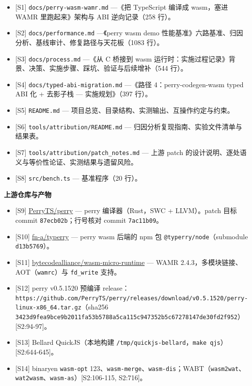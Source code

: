 \documentclass[11pt, a4paper]{article}
\begin{document}
\begin{itemize}
\item {[S1]} \texttt{docs/perry-wasm-wamr.md} —《把 TypeScript 编译成 wasm，塞进 WAMR 里跑起来》架构与 ABI 逆向记录（258 行）。
\item {[S2]} \texttt{docs/performance.md} —《perry wasm demo 性能基准》六路基准、归因分析、基线审计、修复路径与天花板（1083 行）。
\item {[S3]} \texttt{docs/process.md} —《从 C 桥接到 wasm 运行时：实施过程记录》背景、决策、实施步骤、踩坑、验证与后续增补（544 行）。
\item {[S4]} \texttt{docs/typed-abi-migration.md} —《路径 4：perry-codegen-wasm typed ABI 化 + 去影子栈 — 实施规划》（397 行）。
\item {[S5]} \texttt{README.md} — 项目总览、目录结构、实测输出、互操作约定与约束。
\item {[S6]} \texttt{tools/attribution/README.md} — 归因分析复现指南、实验文件清单与结果表。
\item {[S7]} \texttt{tools/attribution/patch\_notes.md} — 上游 patch 的设计说明、逐处语义与等价性论证、实测结果与遗留风险。
\item {[S8]} \texttt{src/bench.ts} — 基准程序（20 行）。
\end{itemize}

\textbf{上游仓库与产物}


\begin{itemize}
\item {[S9]} \href{https://github.com/PerryTS/perry}{PerryTS/perry} — perry 编译器（Rust，SWC + LLVM）。patch 目标 commit \texttt{87ecb02b}；行号核对 commit \texttt{7ac11b09}。
\item {[S10]} \href{https://github.com/fn-a/typerry}{fn-a/typerry} — perry wasm 后端的 npm 包 \texttt{@typerry/node}（submodule \texttt{d13b5769}）。
\item {[S11]} \href{https://github.com/bytecodealliance/wasm-micro-runtime}{bytecodealliance/wasm-micro-runtime} — WAMR 2.4.3，多模块链接、AOT（\texttt{wamrc}）与 \texttt{fd\_write} 支持。
\item {[S12]} perry v0.5.1520 预编译 release：\texttt{https://github.com/PerryTS/perry/releases/download/v0.5.1520/perry-linux-x86\_64.tar.gz}（sha256 \texttt{3423d9fea9bce9b2011fa53b5788a5ca115c947352b5c67278147de30fd2f952}）[S2:94-97]。
\item {[S13]} Bellard QuickJS（本地构建 \texttt{/tmp/quickjs-bellard}，\texttt{make qjs}）[S2:644-645]。
\item {[S14]} binaryen \texttt{wasm-opt} 123、\texttt{wasm-merge}、\texttt{wasm-dis}；WABT（\texttt{wasm2wat}、\texttt{wat2wasm}、\texttt{wasm-as}）[S2:106-115, S2:716]。
\end{itemize}
\end{document}
